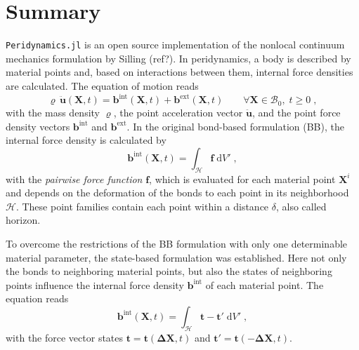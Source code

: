 \documentclass{juliacon}
\newcommand{\vb}{\boldsymbol}
\begin{document}


\maketitle

\section{Summary}

\texttt{Peridynamics.jl} is an open source implementation of the nonlocal continuum mechanics formulation by Silling (ref?).
In peridynamics, a body is described by material points and, based on interactions between them, internal force densities are calculated. 
The equation of motion reads
\begin{equation}
    \varrho \, \vb{\ddot{u}}(\vb{X},t) = \vb{b}^{\mathrm{int}}(\vb{X},t) + \vb{b}^{\mathrm{ext}}(\vb{X},t) \qquad \forall \vb{X} \in \mathcal{B}_0, \; t \geq 0 \; ,
\end{equation} 
with the mass density $\varrho$, the point acceleration vector $\vb{\ddot{u}}$, and the point force density vectors $\vb{b}^{\mathrm{int}}$ and $\vb{b}^{\mathrm{ext}}$. 
In the original bond-based formulation (BB), the internal force density is calculated by
\begin{equation}
    \vb{b}^{\mathrm{int}}(\vb{X},t) = \int_\mathcal{H} \vb{f} \; \mathrm{d}V' \; ,
\end{equation}
with the \emph{pairwise force function} $\vb{f}$, which is evaluated for each material point $\vb{X}^i$ and depends on the deformation of the bonds to each point in its neighborhood $\mathcal{H}$.
These point families contain each point within a distance $\delta$, also called horizon.

To overcome the restrictions of the BB formulation with only one determinable material parameter, the state-based formulation was established.
Here not only the bonds to neighboring material points, but also the states of neighboring points influence the internal force density $\vb{b}^{\mathrm{int}}$ of each material point.
The equation reads
\begin{equation}
    \vb{b}^{\mathrm{int}} (\vb{X},t) = \int_\mathcal{H} \vb{t} - \vb{t}' \; \mathrm{d}V' \; ,
\end{equation}
with the force vector states $\vb{t}=\vb{t}(\vb{\Delta X}, t)$ and $\vb{t}'=\vb{t}(-\vb{\Delta X}, t)$.
\end{document}
